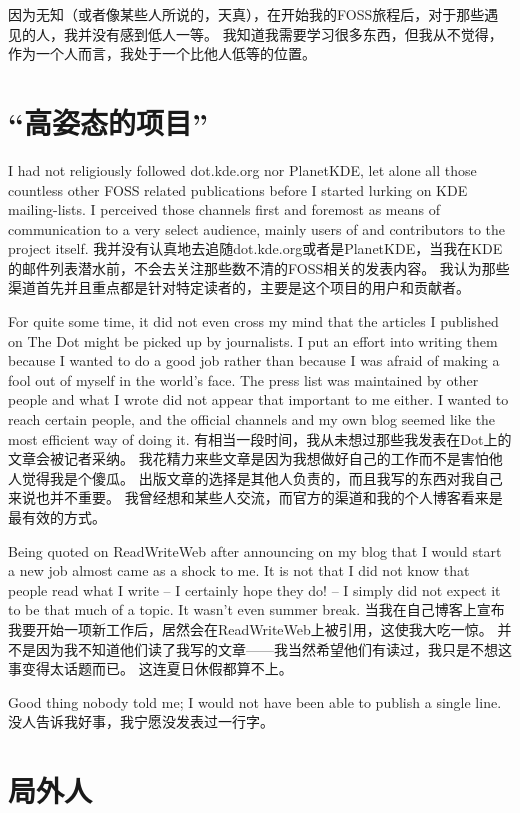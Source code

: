 因为无知（或者像某些人所说的，天真），在开始我的FOSS旅程后，对于那些遇见的人，我并没有感到低人一等。
我知道我需要学习很多东西，但我从不觉得，作为一个人而言，我处于一个比他人低等的位置。

\section*{“高姿态的项目”}

I had not religiously followed dot.kde.org nor PlanetKDE, let alone all those
countless other FOSS related publications before I started lurking on KDE
mailing-lists. I perceived those channels first and foremost as means of
communication to a very select audience, mainly users of and contributors to the
project itself. 
我并没有认真地去追随dot.kde.org或者是PlanetKDE，当我在KDE的邮件列表潜水前，不会去关注那些数不清的FOSS相关的发表内容。
我认为那些渠道首先并且重点都是针对特定读者的，主要是这个项目的用户和贡献者。

For quite some time, it did not even cross my mind that the articles I published
on The Dot might be picked up by journalists. I put an effort into writing them
because I wanted to do a good job rather than because I was afraid of making a
fool out of myself in the world's face. The press list was maintained by other
people and what I wrote did not appear that important to me either. I wanted to
reach certain people, and the official channels and my own blog seemed like the
most efficient way of doing it.
有相当一段时间，我从未想过那些我发表在Dot上的文章会被记者采纳。
我花精力来些文章是因为我想做好自己的工作而不是害怕他人觉得我是个傻瓜。
出版文章的选择是其他人负责的，而且我写的东西对我自己来说也并不重要。
我曾经想和某些人交流，而官方的渠道和我的个人博客看来是最有效的方式。

Being quoted on ReadWriteWeb after announcing on my blog that I would start a
new job almost came as a shock to me. It is not that I did not know that people
read what I write -- I certainly hope they do! -- I simply did not expect it to
be that much of a topic. It wasn't even summer break.
当我在自己博客上宣布我要开始一项新工作后，居然会在ReadWriteWeb上被引用，这使我大吃一惊。
并不是因为我不知道他们读了我写的文章——我当然希望他们有读过，我只是不想这事变得太话题而已。
这连夏日休假都算不上。

Good thing nobody told me; I would not have been able to publish a single line.
没人告诉我好事，我宁愿没发表过一行字。

\section*{局外人}

